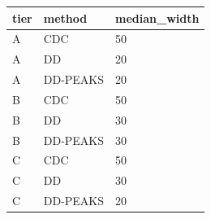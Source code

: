 \begin{tabular}{lll}
\toprule
tier & method & median_width \\
\midrule
A & CDC & 50 \\
A & DD & 20 \\
A & DD-PEAKS & 20 \\
B & CDC & 50 \\
B & DD & 30 \\
B & DD-PEAKS & 30 \\
C & CDC & 50 \\
C & DD & 30 \\
C & DD-PEAKS & 20 \\
\bottomrule
\end{tabular}
